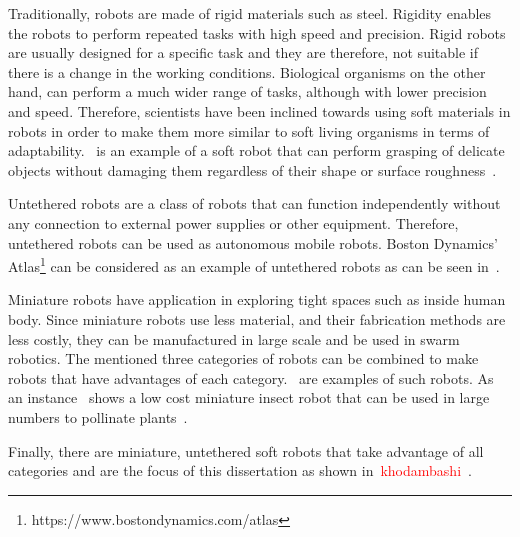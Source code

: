 Traditionally, robots are made of rigid materials such as steel. Rigidity enables the robots to perform repeated tasks with high speed and precision. Rigid robots are usually designed for a specific task and they are therefore, not suitable if there is a change in the working conditions. Biological organisms on the other hand, can perform a much wider range of tasks, although with lower precision and speed. Therefore, scientists have been inclined towards using soft materials in robots in order to make them more similar to soft living organisms in terms of adaptability.~ is an example of a soft robot that can perform grasping of delicate objects without damaging them regardless of their shape or surface roughness~\cite{Li2019}.

Untethered robots are a class of robots that can function independently without any connection to external power supplies or other equipment. Therefore, untethered robots can be used as autonomous mobile robots. Boston Dynamics' Atlas\footnote{https://www.bostondynamics.com/atlas\label{fn:boston}} can be considered as an example of untethered robots as can be seen in~. 

Miniature robots have application in exploring tight spaces such as inside human body. Since miniature robots use less material, and their fabrication methods are less costly, they can be manufactured in large scale and be used in swarm robotics. The mentioned three categories of robots can be combined to make robots that have advantages of each category.~ are examples of such robots. As an instance~ shows a low cost miniature insect robot that can be used in large numbers to pollinate plants~\cite{Jafferis2019}. 

Finally, there are miniature, untethered soft robots that take advantage of all categories and are the focus of this dissertation as shown in~\textcolor{red}{khodambashi~\cite{}}.
 
